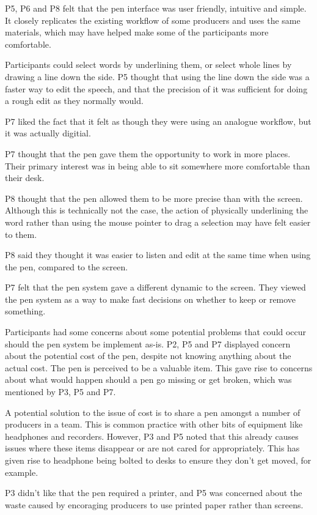 P5, P6 and P8 felt that the pen interface was user friendly, intuitive and simple. It closely replicates the existing
workflow of some producers and uses the same materials, which may have helped make some of the participants more
comfortable.

Participants could select words by underlining them, or select whole lines by drawing a line down the side. P5 thought
that using the line down the side was a faster way to edit the speech, and that the precision of it was sufficient for
doing a rough edit as they normally would.

P7 liked the fact that it felt as though they were using an analogue workflow, but it was actually digitial.

P7 thought that the pen gave them the opportunity to work in more places. Their primary interest was in being able to
sit somewhere more comfortable than their desk.

P8 thought that the pen allowed them to be more precise than with the screen. Although this is technically not the
case, the action of physically underlining the word rather than using the mouse pointer to drag a selection may have
felt easier to them.

P8 said they thought it was easier to listen and edit at the same time when using the pen, compared to the screen.

P7 felt that the pen system gave a different dynamic to the screen. They viewed the pen system as a way to make fast
decisions on whether to keep or remove something.

Participants had some concerns about some potential problems that could occur should the pen system be implement as-is.
P2, P5 and P7 displayed concern about the potential cost of the pen, despite not knowing anything about the actual
cost. The pen is perceived to be a valuable item. This gave rise to concerns about what would happen should a pen go
missing or get broken, which was mentioned by P3, P5 and P7.

A potential solution to the issue of cost is to share a pen amongst a number of producers in a team. This is common
practice with other bits of equipment like headphones and recorders. However, P3 and P5 noted that this already causes
issues where these items disappear or are not cared for appropriately. This has given rise to headphone being bolted to
desks to ensure they don't get moved, for example.

P3 didn't like that the pen required a printer, and P5 was concerned about the waste caused by encoraging producers to
use printed paper rather than screens.

